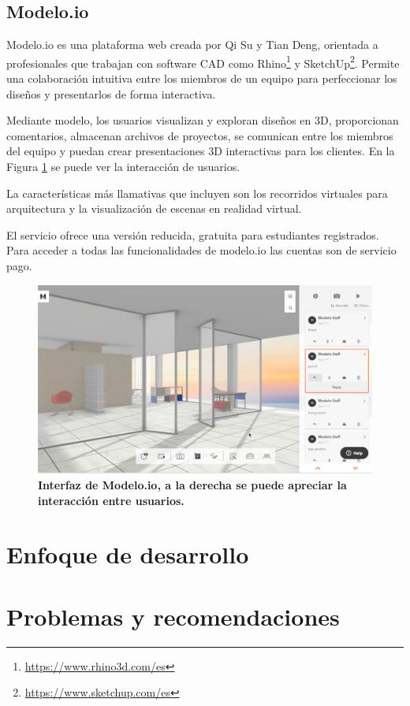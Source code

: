 \subsection{Modelo.io}

Modelo.io\citep{Modelo.io2018} es una plataforma web creada por Qi Su y Tian Deng, orientada a profesionales que trabajan con software CAD como Rhino\footnote{\url{https://www.rhino3d.com/es}} y SketchUp\footnote{\url{https://www.sketchup.com/es}}. Permite una colaboración intuitiva entre los miembros de un equipo para perfeccionar los diseños y presentarlos de forma interactiva.

Mediante modelo, los usuarios visualizan y exploran diseños en 3D, proporcionan comentarios, almacenan archivos de proyectos, se comunican entre los miembros del equipo y puedan crear presentaciones 3D interactivas para los clientes. En la Figura \ref{fig:modelo.io} se puede ver la interacción de usuarios.

La características más llamativas que incluyen son los recorridos virtuales para arquitectura y la visualización de escenas en realidad virtual.

El servicio ofrece una versión reducida, gratuita para estudiantes registrados. Para acceder a todas las funcionalidades de modelo.io las cuentas son de servicio pago.

\begin{figure}[h]
\includegraphics[width=14cm]{Img/WEB/web-modelo.jpg}
\centering
\caption{\textbf{ \footnotesize{Interfaz de Modelo.io, a la derecha se puede apreciar la interacción entre usuarios.}}}
\label{fig:modelo.io}
\end{figure}

\clearpage

\section{Enfoque de desarrollo}




\section{Problemas y recomendaciones
}